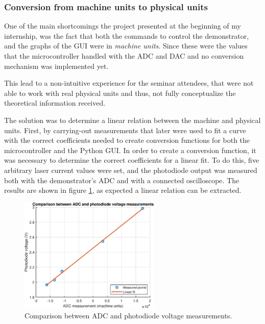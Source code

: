 \documentclass[a4paper,12pt]{article}
\newcounter{subsubsubsection}[subsubsection]
\begin{document}
\subsubsection{Conversion from machine units to physical units}
\label{section:physical_units}

One of the main shortcomings the project presented at the beginning of my internship, was the fact that both the commands to control the demonstrator, and the graphs of the GUI were in \textit{machine units}. Since these were the values that the microcontroller handled with the ADC and DAC and no conversion mechanism was implemented yet.

This lead to a non-intuitive experience for the seminar attendees, that were not able to work with real physical units and thus, not fully conceptualize the theoretical information received. 

The solution was to determine a linear relation between the machine and physical units. First, by carrying-out measurements that later were used to fit a curve with the correct coefficients needed to create conversion functions for both the microcontroller and the Python GUI.
\label{section:word_to_volt}
In order to create a conversion function, it was necessary to determine the correct coefficients for a linear fit. To do this, five arbitrary laser current values were set, and the photodiode output was measured both with the demonstrator's ADC and with a connected oscilloscope. The results are shown in figure \ref{fig:word_to_volt}, as expected a linear relation can be extracted.

\begin{figure}[!h]
    \centering
    \includegraphics[width=0.6\textwidth]{Images/word_to_voltage.eps}
    \captionsetup{justification=centering}
    \caption{Comparison between ADC and photodiode voltage measurements.} 
    \label{fig:word_to_volt}
\end{figure}
\end{document}
